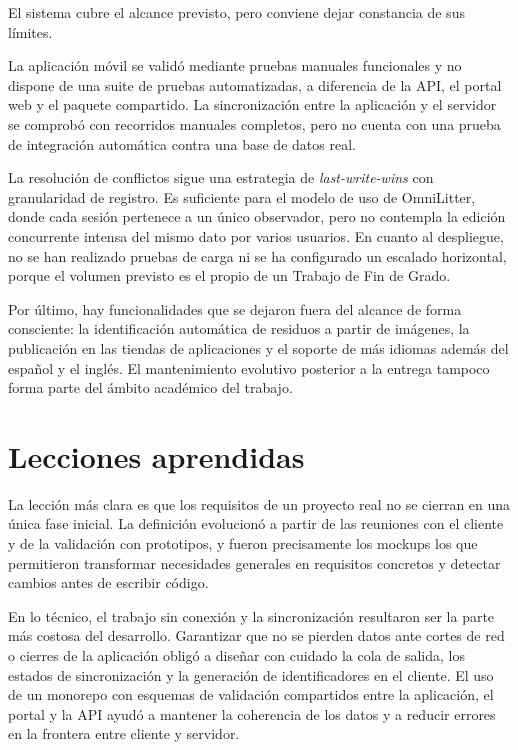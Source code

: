 El sistema cubre el alcance previsto, pero conviene dejar constancia de sus límites.

La aplicación móvil se validó mediante pruebas manuales funcionales y no dispone de una
suite de pruebas automatizadas, a diferencia de la API, el portal web y el paquete
compartido. La sincronización entre la aplicación y el servidor se comprobó con
recorridos manuales completos, pero no cuenta con una prueba de integración automática
contra una base de datos real.

La resolución de conflictos sigue una estrategia de \textit{last-write-wins} con
granularidad de registro. Es suficiente para el modelo de uso de OmniLitter, donde cada
sesión pertenece a un único observador, pero no contempla la edición concurrente intensa
del mismo dato por varios usuarios. En cuanto al despliegue, no se han realizado pruebas
de carga ni se ha configurado un escalado horizontal, porque el volumen previsto es el
propio de un Trabajo de Fin de Grado.

Por último, hay funcionalidades que se dejaron fuera del alcance de forma consciente: la
identificación automática de residuos a partir de imágenes, la publicación en las
tiendas de aplicaciones y el soporte de más idiomas además del español y el inglés. El
mantenimiento evolutivo posterior a la entrega tampoco forma parte del ámbito académico
del trabajo.

\section{Lecciones aprendidas}

La lección más clara es que los requisitos de un proyecto real no se cierran en una
única fase inicial. La definición evolucionó a partir de las reuniones con el cliente y
de la validación con prototipos, y fueron precisamente los mockups los que permitieron
transformar necesidades generales en requisitos concretos y detectar cambios antes de
escribir código.

En lo técnico, el trabajo sin conexión y la sincronización resultaron ser la parte más
costosa del desarrollo. Garantizar que no se pierden datos ante cortes de red o cierres
de la aplicación obligó a diseñar con cuidado la cola de salida, los estados de
sincronización y la generación de identificadores en el cliente. El uso de un monorepo
con esquemas de validación compartidos entre la aplicación, el portal y la API ayudó a
mantener la coherencia de los datos y a reducir errores en la frontera entre cliente y
servidor.

